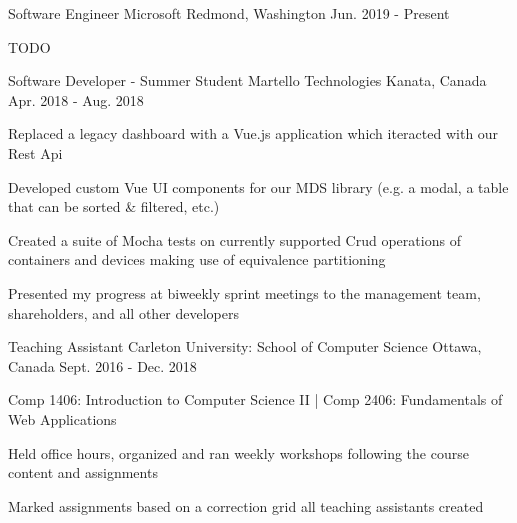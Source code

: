 
\begin{cventries}

  \cventry
    {Software Engineer} %
    {Microsoft} %
    {Redmond, Washington} %
    {Jun. 2019 - Present} %
    {
      \begin{cvitems} %
        \item TODO
      \end{cvitems}
    }

  \cventry
    {Software Developer - Summer Student} %
    {Martello Technologies} %
    {Kanata, Canada} %
    {Apr. 2018 - Aug. 2018} %
    {
      \begin{cvitems} %
        \item Replaced a legacy dashboard with a Vue.js application which iteracted with our Rest Api
        \item Developed custom Vue UI components for our MDS library (e.g. a modal, a table that can be sorted \& filtered, etc.)
        \item Created a suite of Mocha tests on currently supported Crud operations of containers and devices making use of equivalence partitioning
        \item Presented my progress at biweekly sprint meetings to the management team, shareholders, and all other developers
      \end{cvitems}
    }

  \cventry
    {Teaching Assistant} %
    {Carleton University: School of Computer Science} %
    {Ottawa, Canada} %
    {Sept. 2016 - Dec. 2018} %
    {
      \begin{cvitems} %
      \item Comp 1406: Introduction to Computer Science II {\color{awesome}|} Comp 2406: Fundamentals of Web Applications
      \item Held office hours, organized and ran weekly workshops following the course content and assignments
      \item Marked assignments based on a correction grid all teaching assistants created
      \end{cvitems}
    }

\end{cventries}
